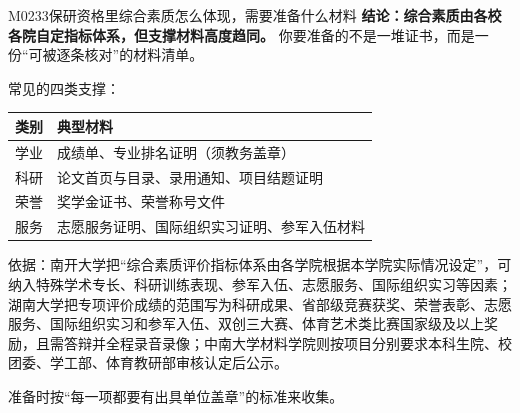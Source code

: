 \begin{qa}{M0233}{保研资格里综合素质怎么体现，需要准备什么材料}
\textbf{结论：综合素质由各校各院自定指标体系，但支撑材料高度趋同。} 你要准备的不是一堆证书，而是一份“可被逐条核对”的材料清单。

常见的四类支撑：
\par\vspace{2pt}\nobreak\begin{center}\footnotesize
\begin{tabularx}{\textwidth}{>{\raggedright\arraybackslash}X>{\raggedright\arraybackslash}X}
\toprule
\textbf{类别} & \textbf{典型材料} \\ \midrule
学业 & 成绩单、专业排名证明（须教务盖章） \\
科研 & 论文首页与目录、录用通知、项目结题证明 \\
荣誉 & 奖学金证书、荣誉称号文件 \\
服务 & 志愿服务证明、国际组织实习证明、参军入伍材料 \\
\bottomrule
\end{tabularx}
\end{center}\vspace{2pt}\par

依据：南开大学把“综合素质评价指标体系由各学院根据本学院实际情况设定”，可纳入特殊学术专长、科研训练表现、参军入伍、志愿服务、国际组织实习等因素；湖南大学把专项评价成绩的范围写为科研成果、省部级竞赛获奖、荣誉表彰、志愿服务、国际组织实习和参军入伍、双创三大赛、体育艺术类比赛国家级及以上奖励，且需答辩并全程录音录像；中南大学材料学院则按项目分别要求本科生院、校团委、学工部、体育教研部审核认定后公示。

准备时按“每一项都要有出具单位盖章”的标准来收集。
\end{qa}

